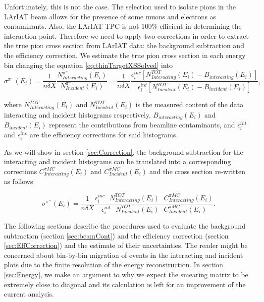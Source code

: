 Unfortunately, this is not the case. The selection used to isolate pions in the LArIAT beam allows for the presence of some muons and electrons as contaminants. Also, the LArIAT TPC is not 100\% efficient in determining the interaction point. Therefore we need to apply two corrections in order to extract the true pion cross section from LArIAT data: the background subtraction and the efficiency correction. 
We estimate the true pion cross section in each energy bin changing  the equation \ref{eq:thinTargetXSSolved} into
\begin{equation}
 \sigma^{\pi^-}(E_{i})  =\frac{1}{n \delta X}\frac{N^{\pi^-}_{Interacting} (E_{i})}{N^{\pi^-}_{Incident}(E_{i})} = \frac{1}{n \delta X}\frac{ \epsilon^{inc}_i [ N^{TOT}_{Interacting} (E_{i}) - B_{interacting} (E_i)] }{   \epsilon^{int}_i [N^{TOT}_{Incident}(E_{i}) - B_{incident} (E_i)]},
\label{eq:True}
\end{equation}



 
where  $N^{TOT}_{Interacting} (E_{i})$ and $N^{TOT}_{Incident}(E_{i})$ is the measured content of the data interacting and incident histograms respectively, $B_{interacting} (E_i)$ and $B_{incident} (E_i)$ represent the contributions from beamline contaminants, and  $\epsilon^{int}_i$ and  $\epsilon^{inc}_i$ are the efficiency corrections for said histograms. 

As we will show in section \ref{sec:Correction}, the background subtraction for the interacting and incident histograms can be translated into a corresponding corrections $C^{\pi MC}_{Interacting} (E_{i})$ and $C^{\pi MC}_{Incident} (E_{i})$ and the cross section re-written as follows

\begin{equation}
   \sigma^{\pi^-}(E_{i})  = \frac{1}{n \delta X}\frac{ \epsilon^{inc}_i  \text{  } N^{TOT}_{Interacting} (E_{i}) \text{  } C^{\pi MC}_{Interacting} (E_{i}) }{   \epsilon^{int}_i \text{  }N^{TOT}_{Incident}(E_{i})\text{  } C^{\pi MC}_{Incident} (E_{i})}.
\label{eq:C}
\end{equation}




The following sections describe the procedures used to evaluate  the background subtraction (section \ref{sec:beamCont}) and the efficiency correction (section \ref{sec:EffCorrection})  and the estimate of their uncertainties. 
The reader might be concerned about bin-by-bin migration of events in the interacting and incident plots due to the finite resolution of the energy reconstruction. In section \ref{sec:Energy}, we make an argument to why we expect the smearing matrix to be extremely close to diagonal and its calculation is left for an improvement of the current analysis.



